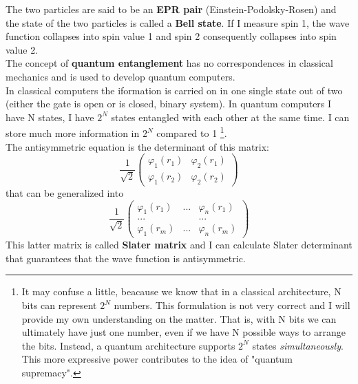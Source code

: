 The two particles are said to be an \textbf{EPR pair} (Einstein-Podolsky-Rosen) and the state of the two particles is called a \textbf{Bell state}.
If I measure spin 1, the wave function collapses into spin value 1 and spin 2 consequently collapses into spin value 2.\\
The concept of \textbf{quantum entanglement} has no correspondences in classical mechanics and is used to develop quantum computers.\\
In classical computers the iformation is carried on in one single state out of two (either the gate is open or is closed, binary system). In quantum computers I have N states, I have $2^N$ states entangled with each other at the same time. I can store much more information in $2^N$ compared to 1 \footnote{It may confuse a little, beacause we know that in a classical architecture, N bits can represent $2^N$ numbers. This formulation is not very correct and I will provide my own understanding on the matter. That is, with N bits we can ultimately have just one number, even if we have N possible ways to arrange the bits. Instead, a quantum architecture supports $2^N$ states \textit{simultaneously}. This more expressive power contributes to the idea of "quantum supremacy".}. \\
\newline
The antisymmetric equation is the determinant of this matrix:
\[
\frac{1}{\sqrt{2}}
\begin{pmatrix}
\varphi_1(r_1)&\varphi_2(r_1)\\
\varphi_1(r_2)&\varphi_2(r_2)
\end{pmatrix}
\]
that can be generalized into
\[
\frac{1}{\sqrt{2}}
\begin{pmatrix}
\varphi_1(r_1)&...&\varphi_n(r_1)\\
... & &...\\
\varphi_1(r_m)&...&\varphi_n(r_m)
\end{pmatrix}
\]
This latter matrix is called \textbf{Slater matrix} and I can calculate Slater determinant that guarantees that the wave function is antisymmetric.\\

